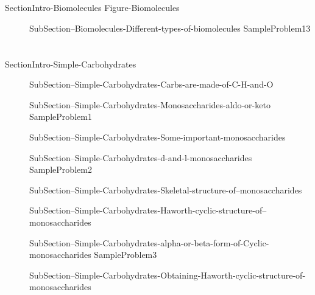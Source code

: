 \documentclass[main.tex]{subfiles}
\begin{document}
\section{\color{blue!30!black}{Biomolecules}}
{SectionIntro-Biomolecules}
{Figure-Biomolecules}
\sloppy\begin{description}
\item[] {SubSection--Biomolecules-Different-types-of-biomolecules}
{SampleProblem13}
\end{description}




\section{\color{blue!30!black}{Simple Carbohydrates}}
{SectionIntro-Simple-Carbohydrates}
\sloppy\begin{description}
\item[] {SubSection--Simple-Carbohydrates-Carbs-are-made-of-C-H-and-O}
\item[] {SubSection--Simple-Carbohydrates-Monosaccharides-aldo-or-keto}
  {SampleProblem1}
\item[] {SubSection--Simple-Carbohydrates-Some-important-monosaccharides}
\item[] {SubSection--Simple-Carbohydrates-d-and-l-monosaccharides}
{SampleProblem2}
\item[] {SubSection--Simple-Carbohydrates-Skeletal-structure-of--monosaccharides}
\item[] {SubSection--Simple-Carbohydrates-Haworth-cyclic-structure-of--monosaccharides}
\item[] {SubSection--Simple-Carbohydrates-alpha-or-beta-form-of-Cyclic-monosaccharides}
{SampleProblem3}
\item[] {SubSection--Simple-Carbohydrates-Obtaining-Haworth-cyclic-structure-of-monosaccharides}
\end{description}
\end{document}
